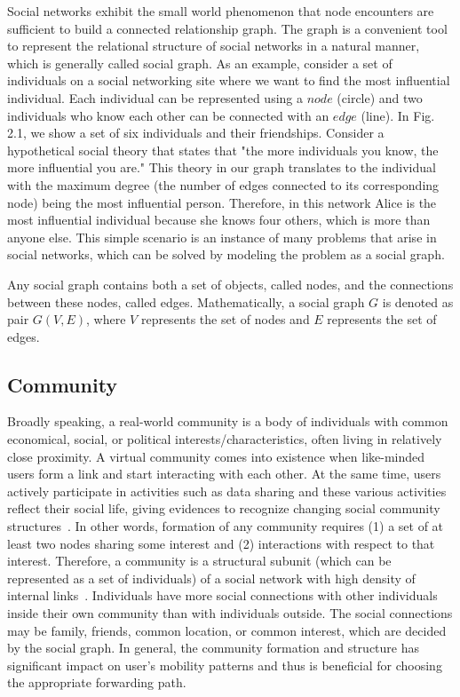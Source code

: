Social networks exhibit the small world phenomenon that node encounters are sufficient to build a connected relationship graph. The graph is a convenient tool to represent the relational structure of social networks in a natural manner, which is generally called social graph. As an example, consider a set of individuals on a social networking site where we want to find the most influential individual. Each individual can be represented using a $node$ (circle) and two individuals who know each other can be connected with an $edge$ (line). In Fig. 2.1, we show a set of six individuals and their friendships. Consider a hypothetical social theory that states that "the more individuals you know, the more influential you are." This theory in our graph translates to the individual with the maximum degree (the number of edges connected to its corresponding node) being the most influential person. Therefore, in this network Alice is the most influential individual because she knows four others, which is more than anyone else. This simple scenario is an instance of many problems that arise in social networks, which can be solved by modeling the problem as a social graph.

Any social graph contains both a set of objects, called nodes, and the connections between these nodes, called edges. Mathematically, a social graph $G$ is denoted as pair $G(V,E)$, where $V$ represents the set of nodes and $E$ represents the set of edges.

\subsection{Community}\label{Chap2_01_02}
Broadly speaking, a real-world community is a body of individuals with common economical, social, or political interests/characteristics, often living in relatively close proximity. A virtual community comes into existence when like-minded users form a link and start interacting with each other. At the same time, users actively participate in activities such as data sharing and these various activities reflect their social life, giving evidences to recognize changing social community structures~\cite{LTang2011}. In other words, formation of any community requires (1) a set of at least two nodes sharing some interest and (2) interactions with respect to that interest. Therefore, a community is a structural subunit (which can be represented as a set of individuals) of a social network with high density of internal links~\cite{FLi2009}. Individuals have more social connections with other individuals inside their own community than with individuals outside. The social connections may be family, friends, common location, or common interest, which are decided by the social graph. In general, the community formation and structure has significant impact on user's mobility patterns and thus is beneficial for choosing the appropriate forwarding path.

